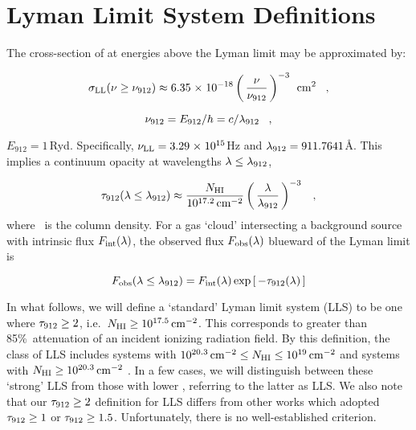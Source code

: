 \documentclass[12pt,preprint]{aastex}
\begin{document}
\section{Lyman Limit System Definitions}
\label{sec:def}

The cross-section of  at energies above the Lyman limit
may be approximated by:

\begin{equation}
\sigma_{\rm LL}(\nu \ge \nu_{\rm 912}) \approx  
  6.35 {\; \times \; 10^{-18}} \left ( \, \frac{\nu}{\nu_{\rm 912}} \, \right )^{-3} \; \, {\rm cm^{2}} \;\;\; ,
\end{equation}

\begin{equation}
\nu_{\rm 912} = E_{912}/h = c/\lambda_{\rm 912} \;\;\; , 
\end{equation}

\noindent $E_{912} = 1$\,Ryd.  Specifically, 
$\nu_{\rm LL} = 3.29 {\; \times \; 10^{15}}$Hz and 
$\lambda_{\rm 912} = 911.7641$\AA.
This implies a continuum opacity at wavelengths $\lambda \le \lambda_{\rm 912}$,

\begin{equation}
\tau_{\rm 912}(\lambda \le \lambda_{\rm 912}) \approx \frac{N_{\rm HI}}{10^{17.2} \, {\rm cm^{-2}}} \left ( \, 
   \frac{\lambda}{\lambda_{\rm 912}} \, \right )^{-3} \;\;\; ,
\end{equation}
where \nhi\ is the  column density. 
For a gas `cloud' intersecting a background source with intrinsic flux
$F_{\rm int}(\lambda)$, the observed flux $F_{\rm obs}(\lambda)$
blueward of the Lyman limit is 

\begin{equation}
F_{\rm obs}(\lambda \le \lambda_{\rm 912}) = 
  F_{\rm int}(\lambda) \exp \left [ \, -\tau_{\rm 912}(\lambda) \, \right ]
\label{eqn:flux}
\end{equation}

In what follows, we will define a `standard' Lyman limit system (LLS) to be
one where $\tau_{\rm 912} \ge 2$, i.e.\ $N_{\rm HI} \ge 10^{17.5} \, {\rm cm^{-2}}$.
This corresponds to greater than 85\%\ attenuation of an 
incident ionizing radiation field. 
By this definition, the class of LLS includes systems with
$10^{20.3} \, {\rm cm^{-2}} \le N_{\rm HI} \le 10^{19} \, {\rm cm^{-2}}$ 
\citep[the so-called super-LLS or sub-DLAs; e.g.][]{opb+07} and systems with
$N_{\rm HI} \ge 10^{20.3} \, {\rm cm^{-2}}$ \citep[the damped \lya\ systems; e.g.][]{wgp05}.
In a few cases, we will distinguish between these `strong' LLS from 
those with lower \nhi, referring to the latter as LLS.
We also note that our $\tau_{\rm 912} \ge 2$ definition for LLS differs
from other works which adopted $\tau_{\rm 912} \ge 1$ or $\tau_{\rm 912} \ge 1.5$.
Unfortunately, there is no well-established criterion.
\end{document}

